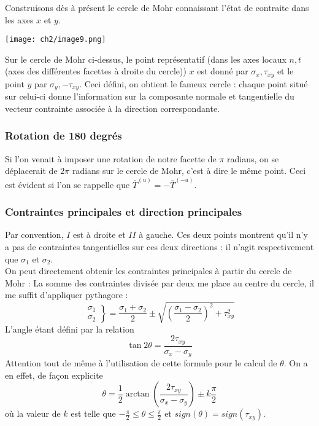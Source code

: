 Construisons dès à présent le cercle de Mohr connaissant l'état de contraite dans les axes $x$ et $y$.
\begin{center}
	\texttt{[image: ch2/image9.png]}
\end{center}   
Sur le cercle de Mohr ci-dessus, le point représentatif (dans les axes locaux $n,t$ (axes des différentes
facettes à droite du cercle)) $x$ est donné par $\sigma_x, \tau_{xy}$ et le point $y$ par $\sigma_y, 
-\tau_{xy}$. Ceci défini, on obtient le fameux cercle : chaque point situé sur celui-ci donne l'information
sur la composante normale et tangentielle du vecteur contrainte associée à la direction correspondante.\\
    
\subsubsection{Rotation de 180 degrés}
Si l'on venait à imposer une rotation de notre facette de $\pi$ radians, on se déplacerait de $2\pi$ radians sur le cercle
de Mohr, c'est à dire le même point. Ceci est évident si l'on se rappelle que $\overline{T}^{(u)} =
-\overline{T}^{(-u)}$.
    
\subsubsection{Contraintes principales et direction principales}
Par convention, $I$ est à droite et $II$ à gauche. Ces deux points montrent qu'il n'y a pas de contraintes
tangentielles sur ces deux directions : il n'agit respectivement que $\sigma_1$ et $\sigma_2$.\\
On peut directement obtenir les contraintes principales à partir du cercle de Mohr : La somme des 
contraintes divisée par deux me place au centre du cercle, il me suffit d'appliquer pythagore :
\begin{equation}
	\left.\begin{array}{c}
	\sigma_1\\
	\sigma_2
	\end{array}\right\} = \dfrac{\sigma_1+\sigma_2}{2}\pm \sqrt{\left(\dfrac{\sigma_1-\sigma_2}{2}\right)^2
		+ \tau_{xy}^2}
\end{equation}
L'angle étant défini par la relation 
\begin{equation}
	\tan 2\theta = \dfrac{2\tau_{xy}}{\sigma_x-\sigma_y}
\end{equation}
Attention tout de même à l'utilisation de cette formule pour le calcul de $\theta$. On a en effet, de 
façon explicite
\begin{equation}
	\theta = \frac{1}{2}\arctan\left(\dfrac{2\tau_{xy}}{\sigma_x-\sigma_y}\right) \pm k\dfrac{\pi}{2}
\end{equation}
où la valeur de $k$ est telle que $-\frac{\pi}{2} \leq \theta \leq \frac{\pi}{2}$ et $sign(\theta) =
sign(\tau_{xy})$.
    

